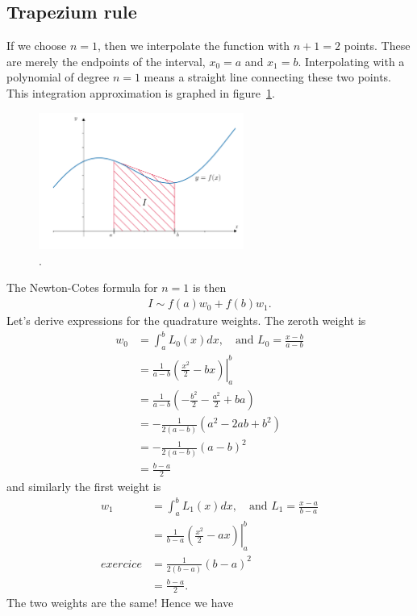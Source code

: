 \subsection{Trapezium rule}
If we choose $n=1$, then we interpolate the function with $n+1=2$ points. These are merely the endpoints of the interval, $x_0=a$ and $x_1=b$. Interpolating with a polynomial of degree $n=1$ means a straight line connecting these two points. This integration approximation is graphed in figure~\ref{fig:ch5_trapezium}.
\begin{figure}[H]
	\begin{center}
	\includegraphics[width=0.6\textwidth]{figures/ch5_trapezium.pdf} 
	  \caption{.} \label{fig:ch5_trapezium}
	\end{center}
\end{figure}
The Newton-Cotes formula for $n=1$ is then
\begin{align*}
I \sim f(a) w_0 + f(b) w_1.
\end{align*}
Let's derive expressions for the quadrature weights. The zeroth weight is
\begin{align*}
w_0 &= \int_a^b L_0(x) dx, \quad \text{and } L_0 = \frac{x-b}{a-b} \\
 &= \frac{1}{a-b} \left. \left(\frac{x^2}{2} - bx \right) \right|_a^b \\
 &= \frac{1}{a-b} \left( -\frac{b^2}{2} - \frac{a^2}{2} + ba \right) \\
 &= -\frac{1}{2(a-b)} \left( a^2 - 2ab + b^2 \right) \\
 &= -\frac{1}{2(a-b)} \left( a - b \right)^2 \\
 &= \frac{b - a}{2}
\end{align*}
and similarly the first weight is
\begin{align*}
w_1 &= \int_a^b L_1(x) dx, \quad \text{and } L_1 = \frac{x-a}{b-a} \\
 &= \frac{1}{b-a} \left. \left(\frac{x^2}{2} - ax \right) \right|_a^b \\exercice
 &= \frac{1}{2(b-a)} \left( b - a \right)^2 \\
 &= \frac{b - a}{2}.
\end{align*}
The two weights are the same! Hence we have 

